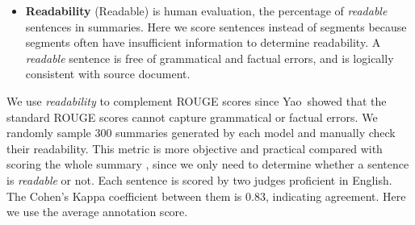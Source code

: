 \begin{itemize}
\item \textbf{Readability} (Readable) is human evaluation, 
the percentage of
\textit{readable} sentences in summaries.
Here we score sentences instead of segments because segments often have
insufficient information to determine readability.
A \textit{readable} sentence is free of grammatical and 
factual errors, 
and is logically consistent with source document.
\end{itemize}

We use \textit{readability} to complement ROUGE scores 
since Yao~\DIFdelbegin {}\DIFdelend \DIFaddbegin {}\DIFaddend showed that the standard 
ROUGE scores cannot capture grammatical or factual errors. 
We randomly sample 300 summaries generated by each model
and manually check their readability. 
This metric is more objective and practical compared with
scoring the whole summary \cite{D18-1205}, since we only need 
to determine whether a sentence is {\em readable} or not.
Each sentence is scored by two judges proficient in English. 
The Cohen's Kappa coefficient between them is $0.83$, 
indicating agreement. Here we use the average annotation score.

